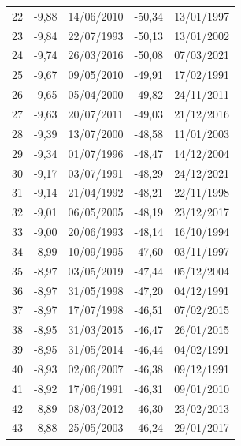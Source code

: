 \documentclass[12pt]{iopart}
\begin{document}
\begin{longtable}{|r|rl|rl|}
22        & -9,88           & 14/06/2010     & -50,34          & 13/01/1997     \\
23        & -9,84           & 22/07/1993     & -50,13          & 13/01/2002     \\
24        & -9,74           & 26/03/2016     & -50,08          & 07/03/2021     \\
25        & -9,67           & 09/05/2010     & -49,91          & 17/02/1991     \\
26        & -9,65           & 05/04/2000     & -49,82          & 24/11/2011     \\
27        & -9,63           & 20/07/2011     & -49,03          & 21/12/2016     \\
28        & -9,39           & 13/07/2000     & -48,58          & 11/01/2003     \\
29        & -9,34           & 01/07/1996     & -48,47          & 14/12/2004     \\
30        & -9,17           & 03/07/1991     & -48,29          & 24/12/2021     \\
31        & -9,14           & 21/04/1992     & -48,21          & 22/11/1998     \\
32        & -9,01           & 06/05/2005     & -48,19          & 23/12/2017     \\
33        & -9,00           & 20/06/1993     & -48,14          & 16/10/1994     \\
34        & -8,99           & 10/09/1995     & -47,60          & 03/11/1997     \\
35        & -8,97           & 03/05/2019     & -47,44          & 05/12/2004     \\
36        & -8,97           & 31/05/1998     & -47,20          & 04/12/1991     \\
37        & -8,97           & 17/07/1998     & -46,51          & 07/02/2015     \\
38        & -8,95           & 31/03/2015     & -46,47          & 26/01/2015     \\
39        & -8,95           & 31/05/2014     & -46,44          & 04/02/1991     \\
40        & -8,93           & 02/06/2007     & -46,38          & 09/12/1991     \\
41        & -8,92           & 17/06/1991     & -46,31          & 09/01/2010     \\
42        & -8,89           & 08/03/2012     & -46,30          & 23/02/2013     \\
43        & -8,88           & 25/05/2003     & -46,24          & 29/01/2017     \\

\end{longtable}
\end{document}
